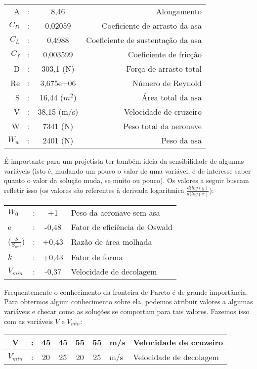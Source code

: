 \documentclass{article}
\begin{document}
\begin{tabular}{|r c c r|}
  \hline
  A & : & 8,46 & Alongamento \\ $C_D$ & : & 0,02059 & Coeficiente de
  arrasto da asa \\ $C_L$ & : & 0,4988 & Coeficiente de sustentação da
  asa \\ $C_f$ & : & 0,003599 & Coeficiente de fricção \\ D & : &
  303,1 (N) & Força de arrasto total \\ Re & : & 3,675e+06 & Número de
  Reynold \\ S & : & 16,44 ($m^2$) & Área total da asa \\ V & : &
  38,15 (m/s) & Velocidade de cruzeiro \\ W & : & 7341 (N) & Peso
                                                             total da aeronave \\ $W_w$ & : & 2401 (N) & Peso da asa \\
  \hline
\end{tabular}

É importante para um projetista ter também ideia da sensibilidade de
algumas variáveis (isto é, mudando um pouco o valor de uma variável, é
de interesse saber quanto o valor da solução muda, se muito ou
pouco). Os valores a seguir buscam refletir isso (os valores são
referentes à derivada logarítmica $\frac{d(log(y)}{d(log(x)}$):

\begin{tabular}{|l c  c  l|}
  \hline
  $W_0$ & : & +1 & Peso da aeronave sem asa \\ e & : & -0,48 & Fator
  de eficiência de Oswald \\ ($\frac{S}{S_{wet}}$) & : & +0,43 & Razão
  de área molhada \\ $k$ & : & +0,43 & Fator de forma \\ $V_{min}$ & : &
                                                                         -0,37 & Velocidade de decolagem \\
  \hline
\end{tabular}


Frequentemente o conhecimento da fronteira de Pareto é de grande
importância. Para obtermos algum conhecimento sobre ela, podemos
atribuir valores a algumas variáveis e checar como as soluções se
comportam para tais valores. Fazemos isso com as variáveis $V$ e
$V_{min}$:

\begin{tabular}{|c c  c  c  c  c  l  l|}
  \hline
  V & : & 45 & 45 & 55 & 55 & m/s & Velocidade de cruzeiro \\ \hline
  $V_{min}$ & : & 20 & 25 & 20 & 25 & m/s & Velocidade de decolagem \\
  \hline
\end{tabular}
\end{document}
